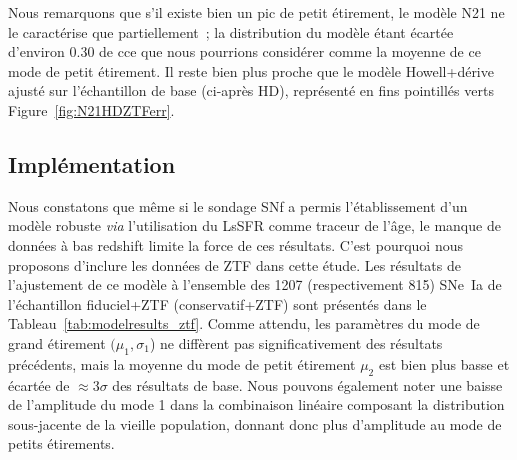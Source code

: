 \documentclass[../main/main.tex]{subfiles}
\begin{document}
Nous remarquons que s'il existe bien un pic de petit étirement, le modèle N21 ne
le caractérise que partiellement~; la distribution du modèle étant écartée
d'environ \num{0.30} de cce que nous pourrions considérer comme la moyenne de ce
mode de petit étirement. Il reste bien plus proche que le modèle Howell+dérive
ajusté sur l'échantillon de base (ci-après HD), représenté en fins pointillés
verts Figure~\ref{fig:N21HDZTFerr}.

\subsection{Implémentation}\label{ssec:xamel}

Nous constatons que même si le sondage SNf a permis l'établissement d'un modèle
robuste \textit{via} l'utilisation du LsSFR comme traceur de l'âge, le manque de
données à bas redshift limite la force de ces résultats. C'est pourquoi nous
proposons d'inclure les données de ZTF dans cette étude. Les résultats de
l'ajustement de ce modèle à l'ensemble des 1207 (respectivement 815) SNe~Ia de
l'échantillon fiduciel+ZTF (conservatif+ZTF) sont présentés dans le
Tableau~\ref{tab:modelresults_ztf}. Comme attendu, les paramètres du mode de
grand étirement $(\mu_1,\sigma_1$) ne diffèrent pas significativement des
résultats précédents, mais la moyenne du mode de petit étirement $\mu_2$ est
bien plus basse et écartée de $\approx 3\sigma$ des résultats de base. Nous
pouvons également noter une baisse de l'amplitude du mode 1 dans la combinaison
linéaire composant la distribution sous-jacente de la vieille population,
donnant donc plus d'amplitude au mode de petits étirements.
\end{document}

